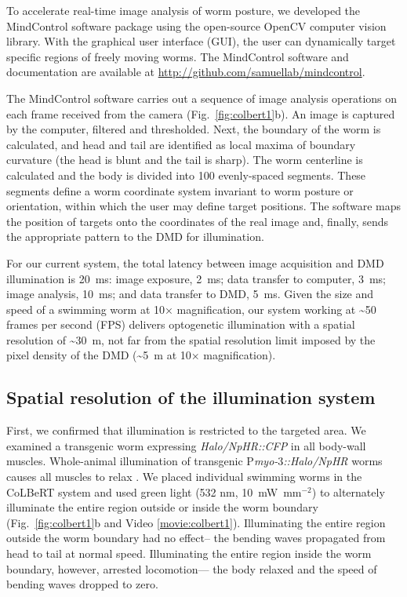 \afterpage{\clearpage}


To accelerate real-time image analysis of worm posture, we developed the MindControl software package using the open-source OpenCV computer vision library\citep{bradski_opencv_2000}. With the graphical user interface (GUI), the user can dynamically target specific regions of freely moving worms. The MindControl software and documentation are available at \href{http://github.com/samuellab/mindcontrol}{http://github.com/samuellab/mindcontrol}.


The MindControl software carries out a sequence of image analysis operations on each frame received from the camera (Fig.~\ref{fig:colbert1}b). An image is captured by the computer, filtered and thresholded. Next, the boundary of the worm is calculated, and head and tail are identified as local maxima of boundary curvature (the head is blunt and the tail is sharp). The worm centerline is calculated and the body is divided into 100 evenly-spaced segments. These segments define a worm coordinate system invariant to worm posture or orientation, within which the user may define target positions. The software maps the position of targets onto the coordinates of the real image and, finally, sends the appropriate pattern to the DMD for illumination.

For our current system, the total latency between image acquisition and DMD illumination is 20~ms: image exposure, 2~ms; data transfer to computer, 3~ms; image analysis, 10~ms; and data transfer to DMD, 5~ms. Given the size and speed of a swimming worm at 10× magnification, our system working at \textasciitilde50 frames per second (FPS) delivers optogenetic illumination with a spatial resolution of \textasciitilde30~\textmu m, not far from the spatial resolution limit imposed by the pixel density of the DMD (\textasciitilde5~\textmu m at 10× magnification).

\subsection{Spatial resolution of the illumination system}
First, we confirmed that illumination is restricted to the targeted area. We examined a transgenic worm expressing \textit{Halo/NpHR::CFP} in all body-wall muscles. Whole-animal illumination of transgenic P\textit{myo-$3$::Halo/NpHR} worms causes all muscles to relax \citep{zhang_multimodal_2007}. We placed individual swimming worms in the CoLBeRT system and used green light (532 nm, 10~mW~mm$^{-2}$) to alternately illuminate the entire region outside or inside the worm boundary (Fig.~\ref{fig:colbert1}b and Video \ref{movie:colbert1}). Illuminating the entire region outside the worm boundary had no effect-- the bending waves propagated from head to tail at normal speed. Illuminating the entire region inside the worm boundary, however, arrested locomotion--- the body relaxed and the speed of bending waves dropped to zero.


